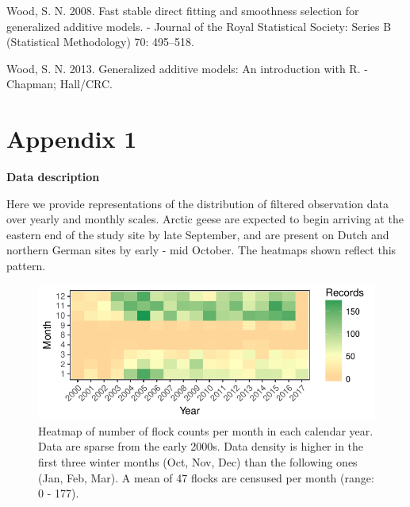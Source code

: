 \documentclass[10pt,twocolumn]{paper}
\begin{document}
\hypertarget{ref-wood2008fast}{}
Wood, S. N. 2008. Fast stable direct fitting and smoothness selection
for generalized additive models. - Journal of the Royal Statistical
Society: Series B (Statistical Methodology) 70: 495--518.

\hypertarget{ref-wood2013gam}{}
Wood, S. N. 2013. Generalized additive models: An introduction with R. -
Chapman; Hall/CRC.

\normalsize

\clearpage

\setcounter{table}{0} \renewcommand{\thetable}{A\arabic{table}}

\renewcommand\thefigure{A\arabic{figure}}

\section{Appendix 1}\label{appendix-1}

\setcounter{figure}{0}

\textbf{Data description}

Here we provide representations of the distribution of filtered
observation data over yearly and monthly scales. Arctic geese are
expected to begin arriving at the eastern end of the study site by late
September, and are present on Dutch and northern German sites by early -
mid October. The heatmaps shown reflect this pattern.

\begin{figure}[H]
\includegraphics[width = 1.5\linewidth]{data_density.pdf}
\caption{{\small Heatmap of number of flock counts per month in each calendar year. Data are sparse from the early 2000s. Data density is higher in the first three winter months (Oct, Nov, Dec) than the following ones (Jan, Feb, Mar). A mean of 47 flocks are censused per month (range: 0 - 177).}}

\end{figure}
\end{document}
